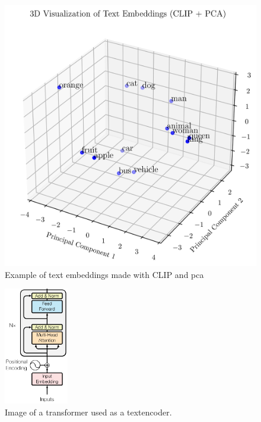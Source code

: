     \begin{figure}
        \centering
        \includegraphics[width=\textwidth]{Images/crossmodalnetworks/3DEmbedding.png}
        \caption{Example of text embeddings made with CLIP and \Acrshort{pca}}
        \label{fig:crossmodalnetworks:3demb}
    \end{figure}

    \begin{figure}
        \centering
        \includegraphics[width=0.25\textwidth]{Images/crossmodalnetworks/The-Transformer-encoder-structure.png}
        \caption{Image of a transformer used as a textencoder\cite{fig:encoder}.}
        \label{fig:crossmodalnetworks:textencoder}
    \end{figure}
    
